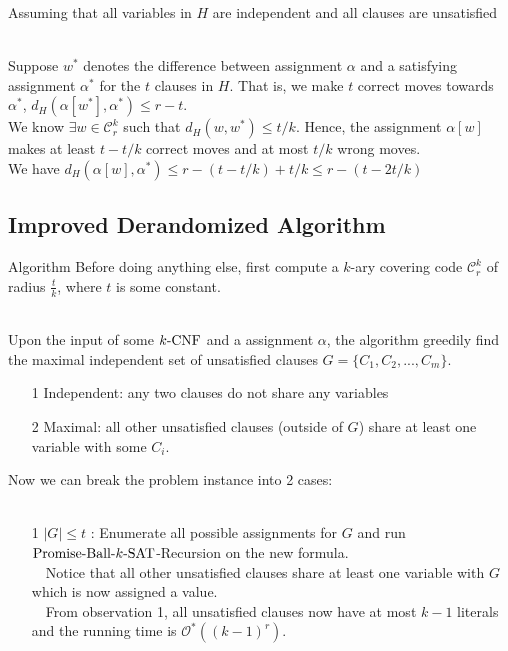 \documentclass[pdf] {beamer}
\newcommand{\SAT}{\textnormal{$k$-SAT}}
\newcommand{\CNF}{\textnormal{$k$-CNF}}
\newcommand{\dist}[2]{d_H(#1,#2)}
\newcommand{\astar}{\alpha^*}
\newcommand{\PBS}{\textnormal{Promise-Ball-$\SAT$}}
\newcommand{\cc}{\mathcal{C}}
\renewcommand{\O}{\mathcal{O}^*}
\begin{document}
	\begin{frame}
	Assuming that all variables in $H$ are independent and all clauses are unsatisfied\\~\

	Suppose $w^*$ denotes the difference between assignment $\alpha$ and a satisfying assignment $\astar$ for the $t$ clauses in $H$. That is, we make $t$ correct moves towards $\astar$, $\dist{\alpha[w^*]}{\astar} \leq r - t$. \\
	We know $\exists w \in \cc_r^k$ such that $\dist{w}{w^*} \leq t/k$. Hence, the assignment $\alpha[w]$ makes at least $t - t/k$ correct moves and at most $t/k$ wrong moves.\\
	We have $\dist{\alpha[w]}{\astar} \leq r - (t - t/k) + t/k \leq r - (t-2t/k)$
\end{frame}
	\subsection{Improved Derandomized Algorithm}
	\begin{frame}{Algorithm}
	Before doing anything else, first compute a $k$-ary covering code $\cc_r^k$ of radius $\frac{t}{k}$, where $t$ is some constant. \\~\
	
	Upon the input of some $\CNF$ and a assignment $\alpha$, the algorithm greedily find the maximal independent set of unsatisfied clauses $G = \{C_1, C_2, ...,C_m\}$. \\
	\begin{enumerate}
		\item[1] Independent: any two clauses do not share any variables\\
		\item[2] Maximal: all other unsatisfied clauses (outside of $G$) share at least one variable with some $C_i$.
	\end{enumerate}
	Now we can break the problem instance into 2 cases: \\~\
	\end{frame}
	\begin{frame}
		\begin{enumerate}
			\item[1] $|G| \leq t$ : Enumerate all possible assignments for $G$ and run $\PBS$-Recursion on the new formula. \\~\
			Notice that all other unsatisfied clauses share at least one variable with $G$ which is now assigned a value. \\~\
			From observation 1, all unsatisfied clauses now have at most $k-1$ literals and the running time is $\O((k-1)^r)$.
		\end{enumerate}
	\end{frame}	
\end{document}
